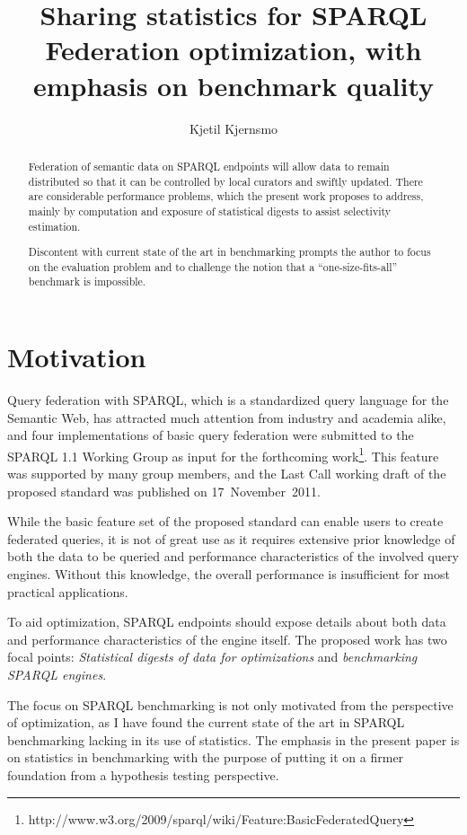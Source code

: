 \documentclass{llncs}
\title{Sharing statistics for SPARQL Federation optimization, with
  emphasis on benchmark quality}
\author{Kjetil Kjernsmo\inst{1}}
\institute{Department of Informatics,
Postboks 1080 Blindern,
0316 Oslo, Norway
\email{kjekje@ifi.uio.no}}
\begin{document}
\maketitle



\begin{abstract}
  Federation of semantic data on SPARQL endpoints will allow data to
  remain distributed so that it can be controlled by local curators
  and swiftly updated. There are considerable performance problems,
  which the present work proposes to address, mainly by computation
  and exposure of statistical digests to assist selectivity
  estimation.

  Discontent with current state of the art in benchmarking prompts the
  author to focus on the evaluation problem and to challenge the
  notion that a ``one-size-fits-all'' benchmark is impossible.
\end{abstract}

\section{Motivation}

Query federation with SPARQL, which is a standardized query language
for the Semantic Web, has attracted much attention
from industry and academia alike, and four implementations of basic
query federation were submitted to the SPARQL 1.1 Working Group as
input for the forthcoming
work\footnote{http://www.w3.org/2009/sparql/wiki/Feature:BasicFederatedQuery}. 
This feature was
supported by many group members, and the Last Call working
draft of the proposed standard was published on 17~November~2011.

While the basic feature set of the proposed standard can enable users
to create federated queries, it is not of great use as it requires
extensive prior knowledge of both the data to be queried and
performance characteristics of the involved query engines. Without
this knowledge, the overall performance is insufficient for most
practical applications.

To aid optimization, SPARQL endpoints should expose details about both
data and performance characteristics of the engine itself. The
proposed work has two focal points: \emph{Statistical digests of
  data for optimizations} and \emph{benchmarking SPARQL engines}. 

The focus on SPARQL benchmarking is not only motivated from the
perspective of optimization, as I have found the current state of the art
in SPARQL benchmarking lacking in its use of statistics. The emphasis
in the present paper is on statistics in benchmarking with the purpose
of putting it on a firmer foundation from a hypothesis testing
perspective.
\end{document}

